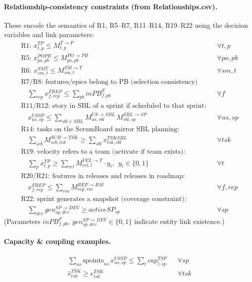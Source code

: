 \documentclass[11pt,a4paper]{article}
\begin{document}
\paragraph{Relationship-consistency constraints (from Relationships.csv).}
These encode the semantics of R1, R5--R7, R11--R14, R19--R22 using the decision variables and link parameters:
\begin{align}
&\text{R1: } x^{TP}_{t,p} \le M^{T\to P}_{t,p} && \forall t,p \label{r1}\\
&\text{R5: } x^{POPB}_{po,pb} \le M^{PO\to PB}_{po,pb} && \forall po,pb \label{r5}\\
&\text{R6: } x^{SMT}_{sm,t} \le M^{SM\to T}_{sm,t} && \forall sm,t \label{r6}\\
&\text{R7/R8: features/epics belong to PB (selection consistency)} && \nonumber\\
&\quad \sum_{rep} x^{FREP}_{f,rep} \le \sum_{pb} inPB^{F}_{f,pb} && \forall f \label{r7}\\
&\text{R11/R12: story in SBL of a sprint if scheduled to that sprint:}\nonumber\\
&\quad x^{USSP}_{us,sp} \le \sum_{sbl\in SBL} M^{US\to SBL}_{us,sbl}\, M^{SBL\to SP}_{sbl,sp} && \forall us,sp \label{r11}\\
&\text{R14: tasks on the ScrumBoard mirror SBL planning:}\nonumber\\
&\quad \sum_{scb} M^{SCB\to TSK}_{scb,tsk} \ge \sum_{sbl} x^{TSKSBL}_{tsk,sbl} && \forall tsk \label{r14}\\
&\text{R19: velocity refers to a team (activate if team exists):}\nonumber\\
&\quad \sum_{p} x^{TP}_{t,p} \ge \sum_{vel} M^{VEL\to T}_{vel,t}\cdot y_t,\ \ y_t\in\{0,1\} && \forall t \label{r19}\\
&\text{R20/R21: features in releases and releases in roadmap:}\nonumber\\
&\quad x^{FREP}_{f,rep} \le \sum_{rm} M^{REP\to RM}_{rep,rm} && \forall f,rep \label{r20}\\
&\text{R22: sprint generates a snapshot (coverage constraint):}\nonumber\\
&\quad \sum_{dev} gen^{SP\to DEV}_{sp,dev} \ge activeSP_{sp} && \forall sp \label{r22}
\end{align}
(Parameters $inPB^{F}_{f,pb}$, $gen^{SP\to DEV}_{sp,dev}\in\{0,1\}$ indicate entity link existence.)

\paragraph{Capacity \& coupling examples.}
\begin{align}
&\sum_{us} \mathrm{spoints}_{us}\, x^{USSP}_{us,sp} \le \sum_{t} cap^{TSP}_{t,sp} && \forall sp \label{cap1}\\
&\hat{e}^{TSK}_{tsk} \ge e^{TSK}_{tsk} && \forall tsk \label{eff1}
\end{align}
\end{document}
